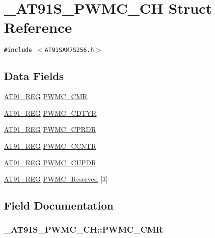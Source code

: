 \hypertarget{struct__AT91S__PWMC__CH}{
\section{\_\-AT91S\_\-PWMC\_\-CH Struct Reference}
\label{struct__AT91S__PWMC__CH}
}
{\tt \#include $<$AT91SAM7S256.h$>$}

\subsection*{Data Fields}
\begin{CompactItemize}
\item 
\hyperlink{AT91SAM7X256_8h_712ad5a1ac1bd02f3e95a7526c283ce1}{AT91\_\-REG} \hyperlink{struct__AT91S__PWMC__CH_dbb97a3f0b481aadf70b44eb09dab317}{PWMC\_\-CMR}
\item 
\hyperlink{AT91SAM7X256_8h_712ad5a1ac1bd02f3e95a7526c283ce1}{AT91\_\-REG} \hyperlink{struct__AT91S__PWMC__CH_26e04d9e84c8a4e470e63ba4166ef707}{PWMC\_\-CDTYR}
\item 
\hyperlink{AT91SAM7X256_8h_712ad5a1ac1bd02f3e95a7526c283ce1}{AT91\_\-REG} \hyperlink{struct__AT91S__PWMC__CH_9bd363b91bbf1fad7c2205b403f4bda0}{PWMC\_\-CPRDR}
\item 
\hyperlink{AT91SAM7X256_8h_712ad5a1ac1bd02f3e95a7526c283ce1}{AT91\_\-REG} \hyperlink{struct__AT91S__PWMC__CH_e1a9fb05c89fe1a67b8a519ac04cff88}{PWMC\_\-CCNTR}
\item 
\hyperlink{AT91SAM7X256_8h_712ad5a1ac1bd02f3e95a7526c283ce1}{AT91\_\-REG} \hyperlink{struct__AT91S__PWMC__CH_bb4f81af917724b30274a8c08918ea32}{PWMC\_\-CUPDR}
\item 
\hyperlink{AT91SAM7X256_8h_712ad5a1ac1bd02f3e95a7526c283ce1}{AT91\_\-REG} \hyperlink{struct__AT91S__PWMC__CH_da98ecbec7cd83bce1e5ec85c25a463d}{PWMC\_\-Reserved} \mbox{[}3\mbox{]}
\end{CompactItemize}


\subsection{Field Documentation}
\hypertarget{struct__AT91S__PWMC__CH_dbb97a3f0b481aadf70b44eb09dab317}{
\subsubsection{ {\bf \_\-AT91S\_\-PWMC\_\-CH::PWMC\_\-CMR}}}
\label{struct__AT91S__PWMC__CH_dbb97a3f0b481aadf70b44eb09dab317}




